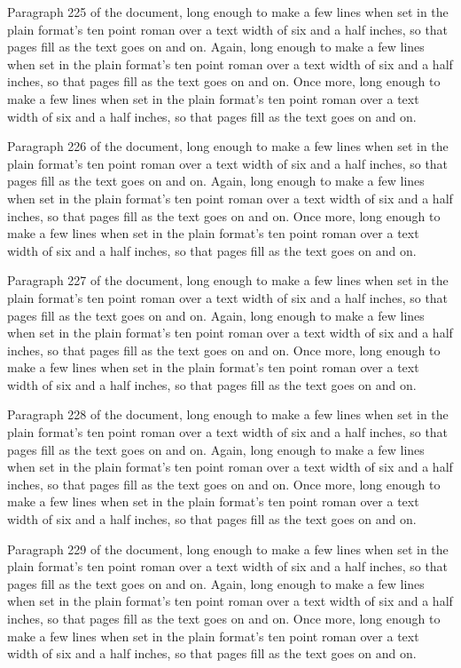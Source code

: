 Paragraph 225 of the document, long enough to make a few lines when set in the plain format's ten point roman over a text width of six and a half inches, so that pages fill as the text goes on and on. Again, long enough to make a few lines when set in the plain format's ten point roman over a text width of six and a half inches, so that pages fill as the text goes on and on. Once more, long enough to make a few lines when set in the plain format's ten point roman over a text width of six and a half inches, so that pages fill as the text goes on and on.

Paragraph 226 of the document, long enough to make a few lines when set in the plain format's ten point roman over a text width of six and a half inches, so that pages fill as the text goes on and on. Again, long enough to make a few lines when set in the plain format's ten point roman over a text width of six and a half inches, so that pages fill as the text goes on and on. Once more, long enough to make a few lines when set in the plain format's ten point roman over a text width of six and a half inches, so that pages fill as the text goes on and on.

Paragraph 227 of the document, long enough to make a few lines when set in the plain format's ten point roman over a text width of six and a half inches, so that pages fill as the text goes on and on. Again, long enough to make a few lines when set in the plain format's ten point roman over a text width of six and a half inches, so that pages fill as the text goes on and on. Once more, long enough to make a few lines when set in the plain format's ten point roman over a text width of six and a half inches, so that pages fill as the text goes on and on.

Paragraph 228 of the document, long enough to make a few lines when set in the plain format's ten point roman over a text width of six and a half inches, so that pages fill as the text goes on and on. Again, long enough to make a few lines when set in the plain format's ten point roman over a text width of six and a half inches, so that pages fill as the text goes on and on. Once more, long enough to make a few lines when set in the plain format's ten point roman over a text width of six and a half inches, so that pages fill as the text goes on and on.

Paragraph 229 of the document, long enough to make a few lines when set in the plain format's ten point roman over a text width of six and a half inches, so that pages fill as the text goes on and on. Again, long enough to make a few lines when set in the plain format's ten point roman over a text width of six and a half inches, so that pages fill as the text goes on and on. Once more, long enough to make a few lines when set in the plain format's ten point roman over a text width of six and a half inches, so that pages fill as the text goes on and on.

